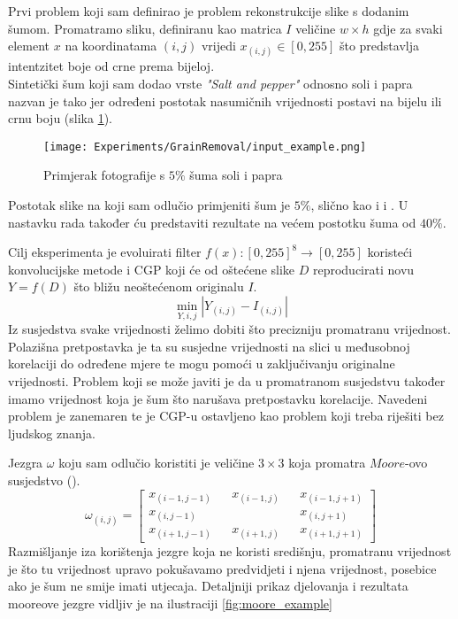 Prvi problem koji sam definirao je problem rekonstrukcije slike s dodanim šumom.
Promatramo sliku, definiranu kao matrica $I$ veličine $w \times h$ gdje za svaki element $x$ na koordinatama $(i, j)$ vrijedi $x_{(i, j)} \in [0, 255]$ što predstavlja intentzitet boje od crne prema bijeloj. \\
Sintetički šum koji sam dodao vrste \emph{"Salt and pepper"} odnosno soli i papra nazvan je tako jer određeni postotak nasumičnih vrijednosti postavi na bijelu ili crnu boju (slika \ref{fig:salt_pepper_example}).

\begin{figure}
	\centering
	\texttt{[image: Experiments/GrainRemoval/input\_example.png]}
	\caption{Primjerak fotografije s $5\%$ šuma soli i papra}
	\label{fig:salt_pepper_example}
\end{figure}

Postotak slike na koji sam odlučio primjeniti šum je $5\%$, slično kao i \cite{cgp_image_processing} i \cite{Sekanina2011}.
U nastavku rada također ću predstaviti rezultate na većem postotku šuma od $40\%$.

Cilj eksperimenta je evoluirati filter $f(x): [0, 255]^8 \rightarrow [0, 255]$ koristeći konvolucijske metode i CGP koji će od oštećene slike $D$ reproducirati novu $Y = f(D)$ što bližu neoštećenom originalu $I$.
$$
\min_{Y, i, j} |Y_{(i, j)} - I_{(i, j)}|
$$
Iz susjedstva svake vrijednosti želimo dobiti što precizniju promatranu vrijednost. \\
Polazišna pretpostavka je ta su susjedne vrijednosti na slici u međusobnoj korelaciji do određene mjere te mogu pomoći u zaključivanju originalne vrijednosti.
Problem koji se može javiti je da u promatranom susjedstvu također imamo vrijednost koja je šum što narušava pretpostavku korelacije.
Navedeni problem je zanemaren te je CGP-u ostavljeno kao problem koji treba riješiti bez ljudskog znanja.

Jezgra $\omega$ koju sam odlučio koristiti je veličine $3 \times 3$ koja promatra $Moore$-ovo susjedstvo (\cite{jakobovic}).
\[
	\omega_{(i, j)}
	=
	\begin{bmatrix}
		x_{(i - 1, j - 1)} && x_{(i - 1, j)} && x_{(i - 1, j + 1)}\\
		x_{(i, j - 1)} && && x_{(i, j + 1)}\\
		x_{(i + 1, j - 1)} && x_{(i + 1, j)} && x_{(i + 1, j + 1)}
	\end{bmatrix}
\]
Razmišljanje iza korištenja jezgre koja ne koristi središnju, promatranu vrijednost je što tu vrijednost upravo pokušavamo predvidjeti i njena vrijednost, posebice ako je šum ne smije imati utjecaja.
Detaljniji prikaz djelovanja i rezultata mooreove jezgre vidljiv je na ilustraciji \ref{fig:moore_example}

